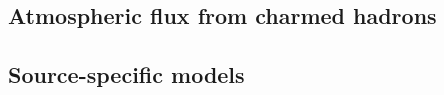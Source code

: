 \subsection{Atmospheric flux from charmed hadrons\label{sec:prompt}}
\begingroup
\graphicspath{{results/HESE_Final_Paper/}}

\endgroup

\subsection{Source-specific models\label{sec:specific_models}}
\begingroup
\graphicspath{{results/HESE_Final_Paper/}}

\endgroup